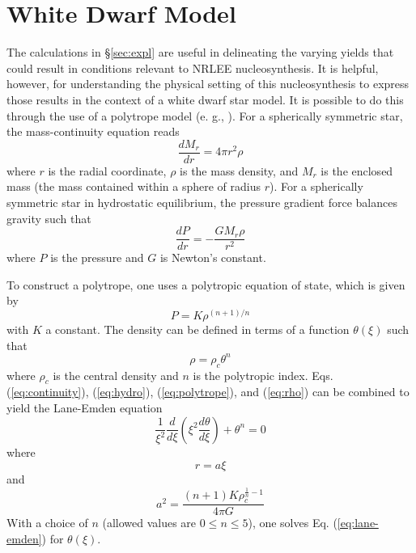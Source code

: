 \documentclass[preprint]{revtex4-2}
\begin{document}
\section{White Dwarf Model} \label{sec:polytrope}

The calculations in \S \ref{sec:expl} are useful in delineating the 
varying yields that could result in conditions relevant to NRLEE
nucleosynthesis.  It is helpful, however, for understanding the physical
setting of this nucleosynthesis to express those results in the context
of a white dwarf star model.  It is possible to do this
through the use of a polytrope model
(e. g., \cite{1984psen.book.....C}).
For a spherically symmetric star, the mass-continuity equation reads
\begin{equation}
\frac{dM_r}{dr} = 4 \pi r^2 \rho
\label{eq:continuity}
\end{equation}
where $r$ is the radial coordinate, $\rho$ is the mass density, and
$M_r$ is the enclosed mass (the mass contained within a sphere of radius $r$).
For a spherically symmetric star in hydrostatic equilibrium, the
pressure gradient force balances gravity such that
\begin{equation}
\frac{dP}{dr} = -\frac{G M_r\rho}{r^2}
\label{eq:hydro}
\end{equation}
where $P$ is the pressure and $G$ is Newton's constant.

To construct a polytrope, one uses a polytropic equation of state,
which is given by
\begin{equation}
P = K \rho^{(n+1)/n}
\label{eq:polytrope}
\end{equation}
with $K$ a constant.  The density can be defined in terms of a function
$\theta(\xi)$ such that
\begin{equation}
\rho = \rho_c \theta^n
\label{eq:rho}
\end{equation}
where $\rho_c$ is the central density and $n$ is the polytropic index.
Eqs. (\ref{eq:continuity}), (\ref{eq:hydro}), (\ref{eq:polytrope}),
and (\ref{eq:rho}) can be combined to yield the Lane-Emden equation
\begin{equation}
\frac{1}{\xi^2} \frac{d}{d\xi}\left(\xi^2\frac{d\theta}{d\xi}\right)
+ \theta^n = 0
\label{eq:lane-emden}
\end{equation}
where
\begin{equation}
r = a \xi
\label{eq:r_xi}
\end{equation}
and
\begin{equation}
a^2 = \frac{(n + 1)K\rho_c^{\frac{1}{n} - 1}}{4\pi G}
\label{eq:a}
\end{equation}
With a choice of $n$ (allowed values are $0 \leq n \leq 5$), one solves
Eq. (\ref{eq:lane-emden}) for $\theta(\xi)$.
\end{document}
